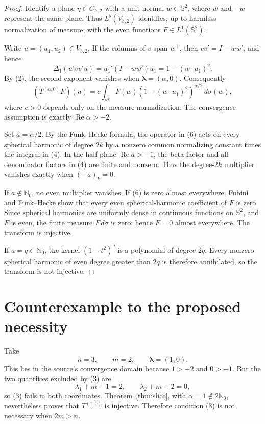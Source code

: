 \documentclass[11pt]{article}
\newcommand{\N}{\mathbb N}
\newcommand{\Sph}{\mathbb S}
\begin{document}
\begin{proof}
Identify a plane \(\eta\in G_{3,2}\) with a unit normal
\(w\in\Sph^2\), where \(w\) and \(-w\) represent the same plane.  Thus
\(L^\flat(V_{3,2})\) identifies, up to harmless normalization of measure,
with the even functions \(F\in L^1(\Sph^2)\).

Write \(u=(u_1,u_2)\in V_{3,2}\).  If the columns of \(v\) span
\(w^\perp\), then \(vv'=I-ww'\), and hence
\[
 \Delta_1(u'vv'u)=u_1'(I-ww')u_1=1-(w\cdot u_1)^2.       \tag{5}
\]
By (2), the second exponent vanishes when
\(\boldsymbol\lambda=(\alpha,0)\).  Consequently
\[
 (T^{(\alpha,0)}F)(u)
 =c\int_{\Sph^2}F(w)(1-(w\cdot u_1)^2)^{\alpha/2}\,d\sigma(w), \tag{6}
\]
where \(c>0\) depends only on the measure normalization.  The convergence
assumption is exactly \(\operatorname{Re}\alpha>-2\).

Set \(a=\alpha/2\).  By the Funk--Hecke formula, the operator in (6)
acts on every spherical harmonic of degree \(2k\) by a nonzero common
normalizing constant times the integral in (4).  In the half-plane
\(\operatorname{Re}a>-1\), the beta factor and all denominator factors in
(4) are finite and nonzero.  Thus the degree-\(2k\) multiplier vanishes
exactly when \((-a)_k=0\).

If \(a\notin\N_0\), no even multiplier vanishes.  If (6) is zero almost
everywhere, Fubini and Funk--Hecke show that every even spherical-harmonic
coefficient of \(F\) is zero.  Since spherical harmonics are uniformly
dense in continuous functions on \(\Sph^2\), and \(F\) is even, the finite
measure \(F\,d\sigma\) is zero; hence \(F=0\) almost everywhere.  The
transform is injective.

If \(a=q\in\N_0\), the kernel \((1-t^2)^q\) is a polynomial of degree
\(2q\).  Every nonzero spherical harmonic of even degree greater than
\(2q\) is therefore annihilated, so the transform is not injective.
\end{proof}

\section{Counterexample to the proposed necessity}

Take
\[
 n=3,\qquad m=2,\qquad \boldsymbol\lambda=(1,0).          \tag{7}
\]
This lies in the source's convergence domain because
\(1>-2\) and \(0>-1\).  But the two quantities excluded by (3) are
\[
 \lambda_1+m-1=2,
 \qquad
 \lambda_2+m-2=0,                                       \tag{8}
\]
so (3) fails in both coordinates.  Theorem~\ref{thm:slice}, with
\(\alpha=1\notin2\N_0\), nevertheless proves that \(T^{(1,0)}\) is
injective.  Therefore condition (3) is not necessary when \(2m>n\).
\end{document}
